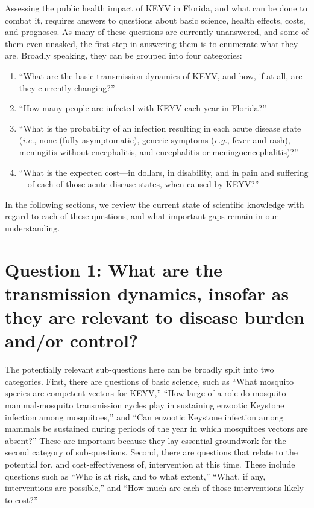 \documentclass[12pt]{article}
\newcommand{\eg}{\textit{e.g.}}
\newcommand{\ie}{\textit{i.e.}}
\begin{document}
        Assessing the public health impact of KEYV in Florida, and what can be done to combat it, requires answers to questions about basic science, health effects, costs, and prognoses. As many of these questions are currently unanswered, and some of them even unasked, the first step in answering them is to enumerate what they are. Broadly speaking, they can be grouped into four categories:
        \begin{enumerate}
            \item ``What are the basic transmission dynamics of KEYV, and how, if at all, are they currently changing?''
            \item ``How many people are infected with KEYV each year in Florida?''
            \item ``What is the probability of an infection resulting in each acute disease state (\ie, none (fully asymptomatic), generic symptoms (\eg, fever and rash), meningitis without encephalitis, and encephalitis or meningoencephalitis)?''
            \item ``What is the expected cost---in dollars, in disability, and in pain and suffering---of each of those acute disease states, when caused by KEYV?''
        \end{enumerate}

        In the following sections, we review the current state of scientific knowledge with regard to each of these questions, and what important gaps remain in our understanding.

    \section[Transmission dynamics]{Question 1: What are the transmission dynamics, insofar as they are relevant to disease burden and/or control?}
    \label{transmission-dynamics}
        The potentially relevant sub-questions here can be broadly split into two categories. First, there are questions of basic science, such as ``What mosquito species are competent vectors for KEYV,'' ``How large of a role do mosquito-mammal-mosquito transmission cycles play in sustaining enzootic Keystone infection among mosquitoes,'' and ``Can enzootic Keystone infection among mammals be sustained during periods of the year in which mosquitoes vectors are absent?'' These are important because they lay essential groundwork for the second category of sub-questions. Second, there are questions that relate to the potential for, and cost-effectiveness of, intervention at this time. These include questions such as ``Who is at risk, and to what extent,'' ``What, if any, interventions are possible,'' and ``How much are each of those interventions likely to cost?''
\end{document}
